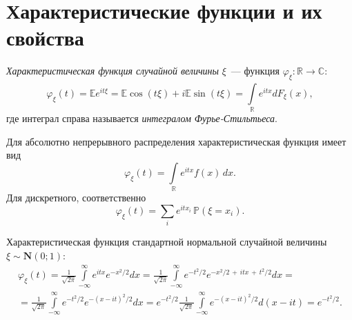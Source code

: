\section{Характеристические функции и их свойства}
\begin{defn}
    \textit{Характеристическая функция случайной величины} $\xi$~--- функция $\varphi_{\xi} \colon \mathbb{R} \rightarrow \mathbb{C}$:
    \begin{equation*}
        \varphi_{\xi}(t)
        = \mathbb{E} e^{it \xi}
        = \mathbb{E} \cos (t \xi)+i \mathbb{E} \sin (t \xi) = \int\limits_{\mathbb{R}}^{} e^{i t x} d F_{\xi}(x),
    \end{equation*}
    где интеграл справа называется \textit{интегралом Фурье-Стильтьеса}.
    
    Для абсолютно непрерывного распределения характеристическая функция имеет вид
    \begin{equation*}
        \varphi_{\xi}(t)=\int\limits_{\mathbb{R}} e^{i t x} f(x) \, dx.
    \end{equation*}
    Для дискретного, соответственно
    \begin{equation*}
        \varphi_{\xi}(t)=\sum\limits_{i} e^{i t x_{i}} \, \mathbb{P}\left(\xi=x_{i}\right) \! .
    \end{equation*}
\end{defn}

\begin{exmp}
    Характеристическая функция стандартной нормальной случайной величины $\xi \sim \mathbf{N}(0;1)$:
    \begin{multline*}
        \varphi_{\xi}(t) 
        = \frac{1}{\sqrt{2 \pi}} \int\limits_{-\infty}^{\infty} e^{i t x} e^{-x^{2} / 2} d x
        = \frac{1}{\sqrt{2 \pi}} \int\limits_{-\infty}^{\infty} e^{-t^{2} / 2} e^{-x^2/2 \,+\, itx \,+\, t^2/2} d x = \\
        = \frac{1}{\sqrt{2 \pi}} \int\limits_{-\infty}^{\infty} e^{-t^{2} / 2} e^{-(x-i t)^{2} / 2} d x =  
         e^{-t^{2} / 2} \frac{1}{\sqrt{2 \pi}} \int\limits_{-\infty}^{\infty} e^{-(x-i t)^{2} / 2} d(x-i t)
        = e^{-t^{2} / 2}.
    \end{multline*}
\end{exmp}

